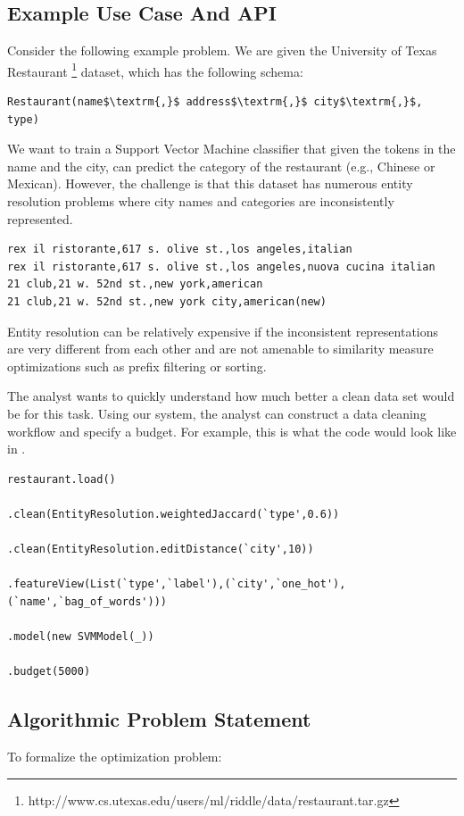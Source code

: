 \subsection{Example Use Case And API}
Consider the following example problem.
We are given the University of Texas Restaurant \footnote{http://www.cs.utexas.edu/users/ml/riddle/data/restaurant.tar.gz} dataset, which has the following schema:
\begin{lstlisting}[mathescape,basicstyle={\scriptsize}]
Restaurant(name$\textrm{,}$ address$\textrm{,}$ city$\textrm{,}$, type)
\end{lstlisting}
We want to train a Support Vector Machine classifier that given the tokens in the name and the city, can predict the category of the restaurant (e.g., Chinese or Mexican).
However, the challenge is that this dataset has numerous entity resolution problems where city names and categories are inconsistently represented.
\begin{lstlisting}[mathescape,basicstyle={\scriptsize}]
rex il ristorante,617 s. olive st.,los angeles,italian
rex il ristorante,617 s. olive st.,los angeles,nuova cucina italian
21 club,21 w. 52nd st.,new york,american
21 club,21 w. 52nd st.,new york city,american(new)
\end{lstlisting}
Entity resolution can be relatively expensive if the inconsistent representations are very different from each other and are not amenable to similarity measure optimizations such as prefix filtering or sorting.


The analyst wants to quickly understand how much better a clean data set would be for this task.
Using our system, the analyst can construct a data cleaning workflow and specify a budget.
For example, this is what the code would look like in \sys.
\begin{lstlisting}[mathescape,basicstyle={\scriptsize}]
restaurant.load()

.clean(EntityResolution.weightedJaccard(`type',0.6))

.clean(EntityResolution.editDistance(`city',10))

.featureView(List(`type',`label'),(`city',`one_hot'),(`name',`bag_of_words')))

.model(new SVMModel(_))

.budget(5000)
\end{lstlisting}

\subsection{Algorithmic Problem Statement}
To formalize the optimization problem:

